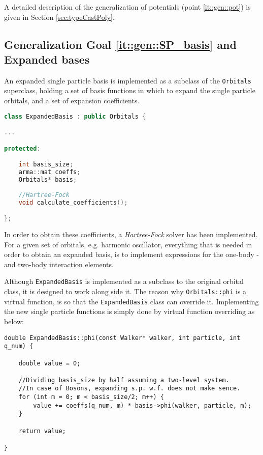 A detailed description of the generalization of potentials (point \ref{it::gen::pot}) is given in Section \ref{sec:typeCastPoly}.

\subsection{Generalization Goal \ref{it::gen::SP_basis} and Expanded bases}



An expanded single particle basis is implemented as a subclass of the \verb+Orbitals+ superclass, holding a set of basis functions in which to expand the single particle orbitals, and a set of expansion coefficients.

\vspace{0.5cm}
\begin{lstlisting}[language=C++]
class ExpandedBasis : public Orbitals {

...

protected:

    int basis_size;
    arma::mat coeffs;
    Orbitals* basis;
    
    //Hartree-Fock
    void calculate_coefficients();

};

\end{lstlisting}

In order to obtain these coefficients, a \textit{Hartree-Fock} solver has been implemented. For a given set of orbitals, e.g. harmonic oscillator, everything that is needed in order to obtain an expanded basis, is to implement expressions for the one-body - and two-body interaction elements.

Although \verb+ExpandedBasis+ is implemented as a subclass to the original orbital class, it is designed to work along side it. The reason why \verb+Orbitals::phi+ is a virtual function, is so that the \verb+ExpandedBasis+ class can override it. Implementing the new single particle functions is simply done by virtual function overriding as below: 

\vspace{0.5cm}
\begin{lstlisting}
double ExpandedBasis::phi(const Walker* walker, int particle, int q_num) {

    double value = 0;
    
    //Dividing basis_size by half assuming a two-level system.
    //In case of Bosons, expanding s.p. w.f. does not make sence.
    for (int m = 0; m < basis_size/2; m++) {
        value += coeffs(q_num, m) * basis->phi(walker, particle, m);
    }

    return value;

}
\end{lstlisting}

